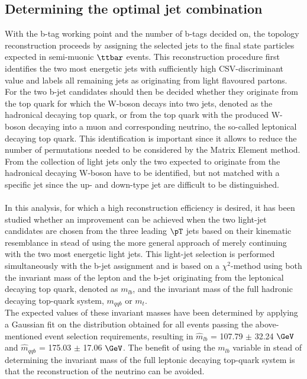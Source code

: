 \subsection{Determining the optimal jet combination}
With the b-tag working point and the number of b-tags decided on, the topology reconstruction proceeds by assigning the selected jets to the final state particles expected in semi-muonic $\ttbar$ events.
This reconstruction procedure first identifies the two most energetic jets with sufficiently high CSV-discriminant value and labels all remaining jets as originating from light flavoured partons.
\\
For the two b-jet candidates should then be decided whether they originate from the top quark for which the W-boson decays into two jets, denoted as the hadronical decaying top quark, or from the top quark with the produced W-boson decaying into a muon and corresponding neutrino, the so-called leptonical decaying top quark.
This identification is important since it allows to reduce the number of permutations needed to be considered by the Matrix Element method.
From the collection of light jets only the two expected to originate from the hadronical decaying W-boson have to be identified, but not matched with a specific jet since the up- and down-type jet are difficult to be distinguished. %
\\
\\
In this analysis, for which a high reconstruction efficiency is desired, it has been studied whether an improvement can be achieved when the two light-jet candidates are chosen from the three leading $\pT$ jets based on their kinematic resemblance in stead of using the more general approach of merely continuing with the two most energetic light jets.
This light-jet selection is performed simultaneously with the b-jet assignment and is based on a $\chi^{2}$-method using both the invariant mass of the lepton and the b-jet originating from the leptonical decaying top quark, denoted as $m_{lb}$, and the invariant mass of the full hadronic decaying top-quark system, $m_{qqb}$ or $m_{t}$.
\\
The expected values of these invariant masses have been determined by applying a Gaussian fit on the distribution obtained for all events passing the above-mentioned event selection requirements, resulting in $\hat{m}_{lb}$ =  107.79 $\pm$ 32.24 $\GeV$ and $\hat{m}_{qqb}$ = 175.03 $\pm$ 17.06 $\GeV$.
The benefit of using the $m_{lb}$ variable in stead of determining the invariant mass of the full leptonic decaying top-quark system is that the reconstruction of the neutrino can be avoided.
